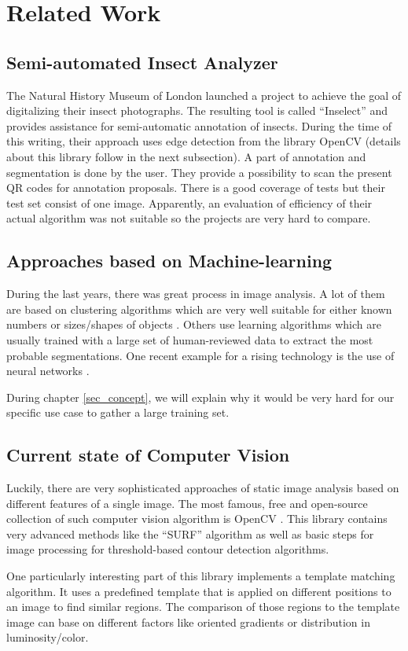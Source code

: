 %
\section{Related Work}
\label{sec_related}

\subsection{Semi-automated Insect Analyzer}

The Natural History Museum of London launched a project to achieve the goal of digitalizing their insect photographs. 
The resulting tool is called ``Inselect'' \cite{Inselect} and provides assistance for semi-automatic annotation of insects. 
During the time of this writing, their approach uses edge detection from the library OpenCV (details about this library follow in the next subsection).
A part of annotation and segmentation is done by the user. 
They provide a possibility to scan the present QR codes for annotation proposals.
There is a good coverage of tests but their test set consist of one image. 
Apparently, an evaluation of efficiency of their actual algorithm was not suitable so the projects are very hard to compare.

\subsection{Approaches based on Machine-learning}

During the last years, there was great process in image analysis. 
A lot of them are based on clustering algorithms which are very well suitable for either known numbers or sizes/shapes of objects \cite{Pappas}. 
Others use learning algorithms which are usually trained with a large set of human-reviewed data to extract the most probable segmentations.
One recent example for a rising technology is the use of neural networks \cite{turagal}.

During chapter \ref{sec_concept}, we will explain why it would be very hard for our specific use case to gather a large training set.

\subsection{Current state of Computer Vision}

Luckily, there are very sophisticated approaches of static image analysis based on different features of a single image.
The most famous, free and open-source collection of such computer vision algorithm is OpenCV \cite{opencv_library}. 
This library contains very advanced methods like the ``SURF'' algorithm as well as basic steps for image processing for threshold-based contour detection algorithms.

One particularly interesting part of this library implements a template matching algorithm. 
It uses a predefined template that is applied on different positions to an image to find similar regions.
The comparison of those regions to the template image can base on different factors like oriented gradients or distribution in luminosity/color.